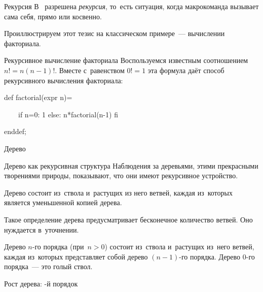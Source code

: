 
\begin{frame}{Рекурсия}
В~ разрешена \emph{рекурсия}, то~есть ситуация, когда
макрокоманда вызывает сама себя, прямо или косвенно.

Проиллюстрируем этот тезис на классическом примере~— вычислении факториала.
\end{frame}


\begin{frame}{Рекурсивное вычисление факториала}
Воспользуемся известным соотношением $n!=n(n-1)!$. Вместе с~равенством $0!=1$
эта формула даёт способ рекурсивного вычисления факториала:

\begin{programlisting}
def factorial(expr n)=\par
~~~~if n=0: 1 else: n*factorial(n-1) fi\par
enddef;
\end{programlisting}
\end{frame}


\begin{frame}{Дерево}
\centerline{}
\end{frame}


\begin{frame}{Дерево как рекурсивная структура}
Наблюдения за деревьями, этими прекрасными творениями природы, показывают, что
они имеют рекурсивное устройство.

Дерево состоит из~ствола и~растущих из него ветвей, каждая из~которых является
уменьшенной копией дерева.

Такое определение дерева предусматривает бесконечное количество ветвей. Оно
нуждается в~уточнении.

Дерево $n$-го порядка (при $n>0$) состоит из~ствола и~растущих из~него ветвей,
каждая из~которых представляет собой дерево $(n-1)$-го порядка. Дерево $0$-го
порядка~— это голый ствол.
\end{frame}


\begin{frame}{Рост дерева:
%
%
%
%
%
%
%
%
%
%
%
-й порядок}
\centerline{%
%
%
%
%
%
%
%
%
%
%
%
}
\end{frame}

